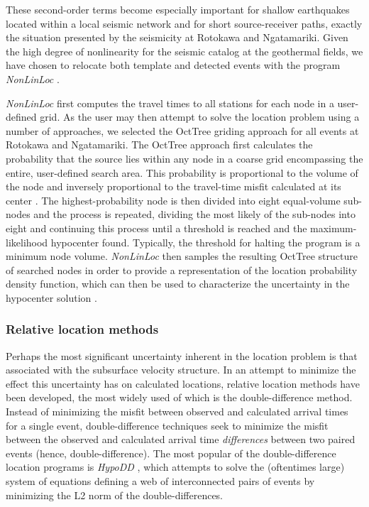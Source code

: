 These second-order terms become especially important for shallow earthquakes located within a local seismic network and for short source-receiver paths, exactly the situation presented by the seismicity at Rotokawa and Ngatamariki. Given the high degree of nonlinearity for the seismic catalog at the geothermal fields, we have chosen to relocate both template and detected events with the program \textit{NonLinLoc} \citep{Lomax_2000}.

\textit{NonLinLoc} first computes the travel times to all stations for each node in a user-defined grid. As the user may then attempt to solve the location problem using a number of approaches, we selected the OctTree griding approach for all events at Rotokawa and Ngatamariki. The OctTree approach first calculates the probability that the source lies within any node in a coarse grid encompassing the entire, user-defined search area. This probability is proportional to the volume of the node and inversely proportional to the travel-time misfit calculated at its center \citep{Lomax_2000}. The highest-probability node is then divided into eight equal-volume sub-nodes and the process is repeated, dividing the most likely of the sub-nodes into eight and continuing this process until a threshold is reached and the maximum-likelihood hypocenter found. Typically, the threshold for halting the program is a minimum node volume. \textit{NonLinLoc} then samples the resulting OctTree structure of searched nodes in order to provide a representation of the location probability density function, which can then be used to characterize the uncertainty in the hypocenter solution \citep{Lomax_2000}.

\subsubsection{Relative location methods}
Perhaps the most significant uncertainty inherent in the location problem is that associated with the subsurface velocity structure. In an attempt to minimize the effect this uncertainty has on calculated locations, relative location methods have been developed, the most widely used of which is the double-difference method. Instead of minimizing the misfit between observed and calculated arrival times for a single event, double-difference techniques seek to minimize the misfit between the observed and calculated arrival time \textit{differences} between two paired events (hence, double-difference). The most popular of the double-difference location programs is \textit{HypoDD} \citep{Waldhauser_2000}, which attempts to solve the (oftentimes large) system of equations defining a web of interconnected pairs of events by minimizing the L2 norm of the double-differences.

